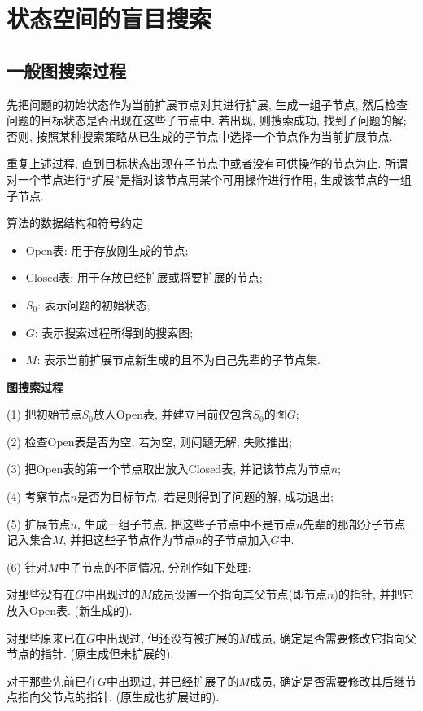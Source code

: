 \section{状态空间的盲目搜索}
\subsection{一般图搜索过程}
先把问题的初始状态作为当前扩展节点对其进行扩展, 生成一组子节点, 然后检查问题的目标状态是否出现在这些子节点中. 若出现, 则搜索成功, 找到了问题的解; 否则, 按照某种搜索策略从已生成的子节点中选择一个节点作为当前扩展节点.

重复上述过程, 直到目标状态出现在子节点中或者没有可供操作的节点为止. 所谓对一个节点进行“扩展”是指对该节点用某个可用操作进行作用, 生成该节点的一组子节点.

算法的数据结构和符号约定
\begin{itemize}
\item Open表: 用于存放刚生成的节点;
\item Closed表: 用于存放已经扩展或将要扩展的节点;
\item $S_0$: 表示问题的初始状态;
\item $G$: 表示搜索过程所得到的搜索图;
\item $M$: 表示当前扩展节点新生成的且不为自己先辈的子节点集.
\end{itemize}

\textbf{图搜索过程}

(1) 把初始节点$S_0$放入Open表, 并建立目前仅包含$S_0$的图$G$;

(2) 检查Open表是否为空, 若为空, 则问题无解, 失败推出;

(3) 把Open表的第一个节点取出放入Closed表, 并记该节点为节点$n$;

(4) 考察节点$n$是否为目标节点. 若是则得到了问题的解, 成功退出;

(5) 扩展节点$n$, 生成一组子节点. 把这些子节点中不是节点$n$先辈的那部分子节点记入集合$M$, 并把这些子节点作为节点$n$的子节点加入$G$中.

(6) 针对$M$中子节点的不同情况, 分别作如下处理:

    \quad {} 对那些没有在$G$中出现过的$M$成员设置一个指向其父节点(即节点$n$)的指针, 并把它放入Open表. (新生成的).

    \quad {} 对那些原来已在$G$中出现过, 但还没有被扩展的$M$成员, 确定是否需要修改它指向父节点的指针. (原生成但未扩展的).

    \quad {} 对于那些先前已在$G$中出现过, 并已经扩展了的$M$成员, 确定是否需要修改其后继节点指向父节点的指针. (原生成也扩展过的).

